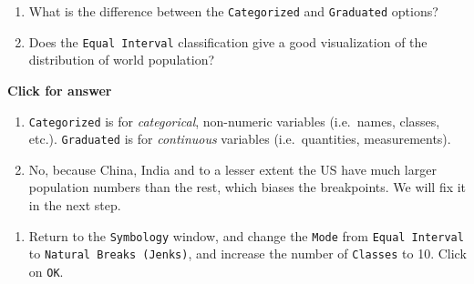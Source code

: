 \documentclass[
  letterpaper,
  DIV=11,
  numbers=noendperiod]{scrreprt}
\providecommand{\tightlist}{%
  \setlength{\itemsep}{0pt}\setlength{\parskip}{0pt}}\usepackage{longtable,booktabs,array}
\begin{document}
\begin{tcolorbox}[enhanced jigsaw, coltitle=black, toprule=.15mm, breakable, opacitybacktitle=0.6, left=2mm, colback=white, leftrule=.75mm, rightrule=.15mm, colbacktitle=quarto-callout-important-color!10!white, toptitle=1mm, titlerule=0mm, colframe=quarto-callout-important-color-frame, arc=.35mm, bottomtitle=1mm, opacityback=0, bottomrule=.15mm, title=\textcolor{quarto-callout-important-color}{\faExclamation}\hspace{0.5em}{Stop and Think}]

\begin{enumerate}
\def\labelenumi{\alph{enumi})}
\item
  What is the difference between the \texttt{Categorized} and
  \texttt{Graduated} options?
\item
  Does the \texttt{Equal\ Interval} classification give a good
  visualization of the distribution of world population?
\end{enumerate}

\end{tcolorbox}

\begin{tcolorbox}[enhanced jigsaw, toprule=.15mm, breakable, left=2mm, colframe=quarto-callout-important-color-frame, colback=white, arc=.35mm, leftrule=.75mm, opacityback=0, rightrule=.15mm, bottomrule=.15mm]

\vspace{-3mm}\textbf{Click for answer}\vspace{3mm}

\begin{enumerate}
\def\labelenumi{\alph{enumi})}
\item
  \texttt{Categorized} is for \emph{categorical}, non-numeric variables
  (i.e.~names, classes, etc.). \texttt{Graduated} is for
  \emph{continuous} variables (i.e.~quantities, measurements).
\item
  No, because China, India and to a lesser extent the US have much
  larger population numbers than the rest, which biases the breakpoints.
  We will fix it in the next step.
\end{enumerate}

\end{tcolorbox}

\begin{enumerate}
\def\labelenumi{(\arabic{enumi})}
\setcounter{enumi}{75}
\tightlist
\item
  Return to the \texttt{Symbology} window, and change the \texttt{Mode}
  from \texttt{Equal\ Interval} to \texttt{Natural\ Breaks\ (Jenks)},
  and increase the number of \texttt{Classes} to 10. Click on
  \texttt{OK}.
\end{enumerate}
\end{document}
